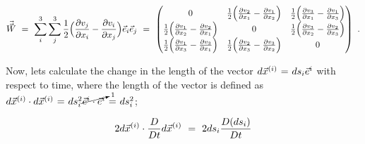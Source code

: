\documentclass{article}
\begin{document}
\begin{equation} \label{eq:1}
\vec{\vec{W}} \hspace{0.125cm} = \hspace{0.125cm} \sum_{i}^{3} \sum_{j}^{3} \frac{1}{2} \Big( \frac{\partial{v_j}}{\partial{x_i}} - \frac{\partial{v_i}}{\partial{x_j}} \Big) \vec{e}_i \vec{e}_j  \hspace{0.125cm} =  \hspace{0.125cm}  \begin{pmatrix} 0 & \frac{1}{2} \Big( \frac{\partial{v_2}}{\partial{x_1}} - \frac{\partial{v_1}}{\partial{x_2}} \Big) & \frac{1}{2} \Big( \frac{\partial{v_3}}{\partial{x_1}} - \frac{\partial{v_1}}{\partial{x_3}} \Big) \\ \frac{1}{2} \Big( \frac{\partial{v_1}}{\partial{x_2}} - \frac{\partial{v_2}}{\partial{x_1}}  \Big) & 0 & \frac{1}{2} \Big( \frac{\partial{v_3}}{\partial{x_2}} - \frac{\partial{v_2}}{\partial{x_3}}  \Big) \\ \frac{1}{2} \Big( \frac{\partial{v_1}}{\partial{x_3}} - \frac{\partial{v_3}}{\partial{x_1}} \Big) & \frac{1}{2} \Big( \frac{\partial{v_2}}{\partial{x_3}} - \frac{\partial{v_3}}{\partial{x_2}} \Big) & 0 \end{pmatrix} \hspace{0.125cm} . 
\end{equation} 

Now, lets calculate the change in the length of the vector \begin{math} d \vec{x}^{(i)} \hspace{0.025cm} = \hspace{0.025cm} ds_i \vec{e}^{i} \end{math} with respect to time, where the length of the vector is defined as \begin{math} d \vec{x}^{(i)} \cdot d \vec{x}^{(i)} \hspace{0.025cm} = \hspace{0.025cm} ds_{i}^2 \cancelto{1}{\vec{e}^{i} \cdot \vec{e}^{i}} \hspace{0.025cm} = \hspace{0.025cm} ds_{i}^2 \end{math};

\begin{equation} \label{eq:1}
2 d \vec{x}^{(i)} \cdot \frac{D}{D t} d \vec{x}^{(i)} \hspace{0.125cm} = \hspace{0.125cm} 2 ds_i \frac{D ( ds_i )}{D t}
\end{equation} 
\end{document}
